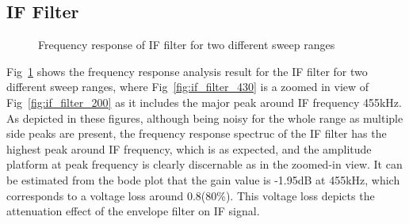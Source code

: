 \documentclass[a4paper,12pt]{article}
\begin{document}
\subsection{IF Filter}

\vspace{-1.5em}
\begin{figure}[H]
    \centering
    \hspace{0pt}  %
    \caption{Frequency response of IF filter for two different sweep ranges}
    \label{fig:if_filter}
\end{figure}

Fig~\ref{fig:if_filter} shows the frequency response analysis result for the IF filter for two different sweep ranges, where Fig~\ref{fig:if_filter_430} is a zoomed in view of Fig~\ref{fig:if_filter_200} as it includes the major peak around IF frequency 455kHz.
As depicted in these figures, although being noisy for the whole range as multiple side peaks are present, the frequency response spectruc of the IF filter has the highest peak around IF frequency, which is as expected, and the amplitude platform at peak frequency is clearly discernable as in the zoomed-in view.
It can be estimated from the bode plot that the gain value is -1.95dB at 455kHz, which corresponds to a voltage loss around 0.8(80\%). This voltage loss depicts the attenuation effect of the envelope filter on IF signal.
\end{document}

